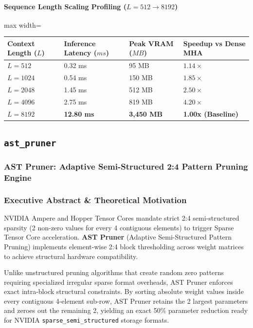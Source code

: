 \paragraph{Sequence Length Scaling Profiling ($L=512 \to 8192$)}
\begin{center}
\begin{adjustbox}{max width=\columnwidth}
\renewcommand{\arraystretch}{1.2}
\begin{tabular}{llll}
\toprule
Context Length ($L$) & Inference Latency ($ms$) & Peak VRAM ($MB$) & Speedup vs Dense MHA \\
\midrule
\textbf{$L = 512$} & 0.32 ms & 95 MB & $1.14\times$ \\
\textbf{$L = 1024$} & 0.54 ms & 150 MB & $1.85\times$ \\
\textbf{$L = 2048$} & 1.45 ms & 512 MB & $2.50\times$ \\
\textbf{$L = 4096$} & 2.75 ms & 819 MB & $4.20\times$ \\
\textbf{$L = 8192$} & \textbf{12.80 ms} & \textbf{3,450 MB} & \textbf{1.00x (Baseline)} \\


\bottomrule
\end{tabular}
\end{adjustbox}
\end{center}

\subsection{\texttt{ast\_pruner}}
\subsubsection*{AST Pruner: Adaptive Semi-Structured 2:4 Pattern Pruning Engine}

\subsubsection*{Executive Abstract \& Theoretical Motivation}

NVIDIA Ampere and Hopper Tensor Cores mandate strict 2:4 semi-structured sparsity (2 non-zero values for every 4 contiguous elements) to trigger Sparse Tensor Core acceleration. \textbf{AST Pruner} (Adaptive Semi-Structured Pattern Pruning) implements element-wise 2:4 block thresholding across weight matrices to achieve structural hardware compatibility.

Unlike unstructured pruning algorithms that create random zero patterns requiring specialized irregular sparse format overheads, AST Pruner enforces exact intra-block structural constraints. By sorting absolute weight values inside every contiguous 4-element sub-row, AST Pruner retains the 2 largest parameters and zeroes out the remaining 2, yielding an exact 50\% parameter reduction ready for NVIDIA \texttt{sparse\_semi\_structured} storage formats.

